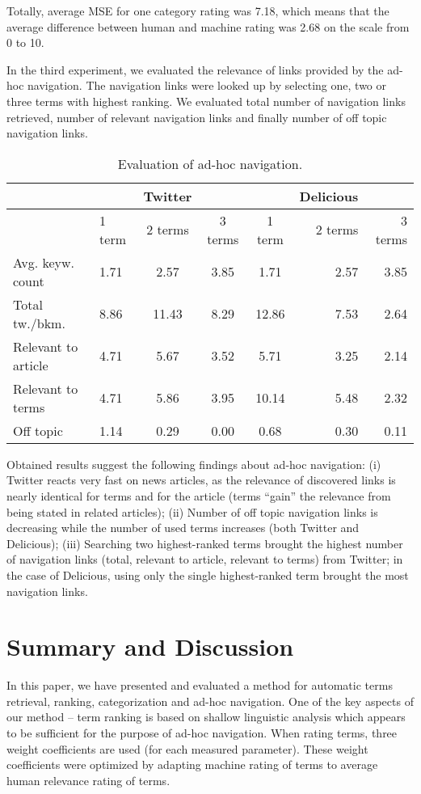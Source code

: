 \documentclass{llncs}
\begin{document}
Totally, average MSE for one category rating was 7.18, which means that the average difference between human and machine rating was 2.68 on the scale from 0 to 10. 

In the third experiment, we evaluated the relevance of links provided by the ad-hoc navigation. The navigation links were looked up by selecting one, two or three terms with highest ranking. We evaluated total number of navigation links retrieved, number of relevant navigation links and finally number of off topic navigation links. 

\begin{table}[ht]
\centering
\caption{Evaluation of ad-hoc navigation. }
\label{tab2}
\begin{tabular}{|l|lcc|crr|}
\hline
 & & Twitter & & & Delicious & \\
\hline
 & 1 term & 2 terms & 3 terms & 1 term & 2 terms & 3 terms \\
\hline
Avg. keyw. count &	1.71 &	2.57 &	3.85 &	1.71 &	2.57 &	3.85  \\
Total tw./bkm. &	8.86 &	11.43 &	8.29 &	12.86 &	7.53 &	2.64 \\
Relevant to article &	4.71 &	5.67 &	3.52 &	5.71 &	3.25 &	2.14  \\
Relevant to terms &	4.71 &	5.86 &	3.95 &	10.14 &	5.48 & 	2.32  \\
Off topic &	1.14 &	0.29 &	0.00 &	0.68 &	0.30 &	0.11   \\
\hline
\end{tabular}
\end{table}

Obtained results suggest the following findings about ad-hoc navigation: (i) Twitter reacts very fast on news articles, as the relevance of discovered links is nearly identical for terms and for the article (terms “gain” the relevance from being stated in related articles); (ii) Number of off topic navigation links is decreasing while the number of used terms increases (both Twitter and Delicious); (iii) Searching two highest-ranked terms brought the highest number of navigation links (total, relevant to article, relevant to terms) from Twitter; in the case of Delicious, using only the single highest-ranked term brought the most navigation links. 

\section{Summary and Discussion}
In this paper, we have presented and evaluated a method for automatic terms retrieval, ranking, categorization and ad-hoc navigation. One of the key aspects of our method – term ranking is based on shallow linguistic analysis which appears to be sufficient for the purpose of ad-hoc navigation. When rating terms, three weight coefficients are used (for each measured parameter). These weight coefficients were optimized by adapting machine rating of terms to average human relevance rating of terms.  
\end{document}
